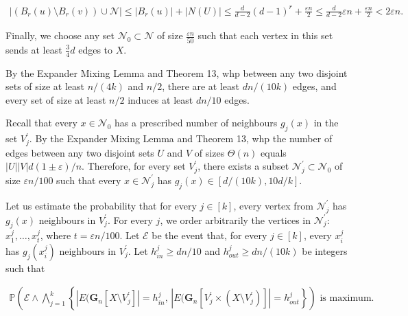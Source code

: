\documentclass[10pt,a4paper]{article}
\begin{document}
\[\begin{gathered}
|(B_{r}(u)\setminus B_{r}(v))\cup\mathcal{N}|\leq|B_{r}(u)|+|N(U)|\leq\frac{d}{d-2}(d-1)^{r}+\frac{\varepsilon n}{2}\leq\frac{d}{d-2}\varepsilon n+\frac{\varepsilon n}{2}<2\varepsilon n.
\end{gathered}\]


Finally, we choose any set $\mathcal{N}_{0}\subset\mathcal{N}$ of size $\frac{\varepsilon n}{50}$ such that each vertex in this set sends at least $\frac{3}{4}d$ edges to $X$.\par




By the Expander Mixing Lemma and Theorem 13, whp between any two disjoint sets of size at least $n/(4k)$ and $n/2$, there are at least $dn/(10k)$ edges, and every set of size at least $n/2$ induces at least $dn/10$ edges.\par




Recall that every $x\in\mathcal{N}_{0}$ has a prescribed number of neighbours $g_{j}(x)$ in the set $V^{\prime}_{j}$.
By the Expander Mixing Lemma and Theorem 13, whp the number of edges between any two disjoint sets $U$ and $V$ of sizes $\Theta(n)$ equals $|U||V|d(1\pm\varepsilon)/n$. Therefore, for every set $V^{\prime}_{j}$, there exists a subset $\mathcal{N}^{\prime}_{j}\subset\mathcal{N}_{0}$ of size $\varepsilon n/100$ such that every $x\in\mathcal{N}^{\prime}_{j}$ has $g_{j}(x)\in[d/(10k),10d/k]$.\par




Let us estimate the probability that for every $j\in[k]$, every vertex from $\mathcal{N}^{\prime}_{j}$ has $g_{j}(x)$ neighbours in $V^{\prime}_{j}$. For every $j$, we order arbitrarily the vertices in $\mathcal{N}^{\prime}_{j}$: $x^{j}_{1},\ldots,x^{j}_{t}$, where
$t=\varepsilon n/100$. Let $\mathcal{E}$ be the event that, for every $j\in[k]$, every $x^{j}_{i}$ has $g_{j}(x^{j}_{i})$ neighbours in $V^{\prime}_{j}$. Let $h^{j}_{in}\geq dn/10$ and $h^{j}_{out}\geq dn/(10k)$ be integers such that\par


\[\begin{gathered}
\mathbb{P}\left(\mathcal{E}\wedge\bigwedge_{j=1}^{k}\left\{|E(\mathbf{G}_{n}[X\setminus V^{\prime}_{j}]|=h^{j}_{in},\,|E(\mathbf{G}_{n}[V^{\prime}_{j}\times(X\setminus V^{\prime}_{j})]|=h^{j}_{out}\right\}\right)\text{ is maximum}.
\end{gathered}\]
\end{document}
